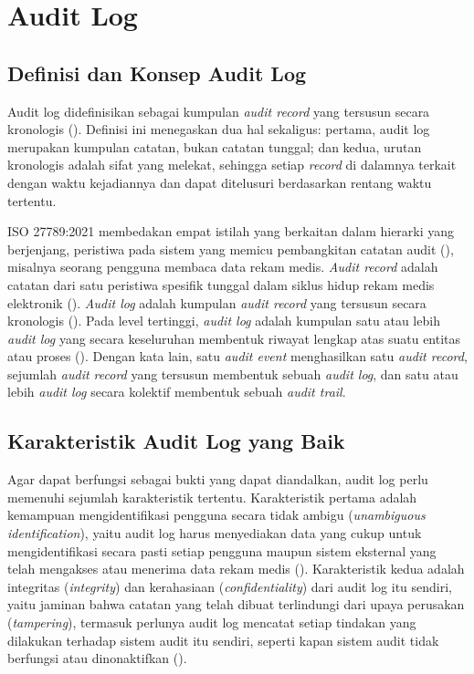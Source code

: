 \section{Audit Log}
\label{sec:audit-log}

\subsection{Definisi dan Konsep Audit Log}
\label{subsec:definisi-audit-log}

Audit log didefinisikan sebagai kumpulan \textit{audit record} yang
tersusun secara kronologis (\cite{iso27789_2021}). Definisi ini
menegaskan dua hal sekaligus: pertama, audit log merupakan kumpulan
catatan, bukan catatan tunggal; dan kedua, urutan kronologis adalah
sifat yang melekat, sehingga setiap \textit{record} di dalamnya
terkait dengan waktu kejadiannya dan dapat ditelusuri berdasarkan
rentang waktu tertentu.

ISO 27789:2021 membedakan empat istilah yang berkaitan dalam hierarki
yang berjenjang, peristiwa pada sistem yang memicu pembangkitan catatan audit (\cite{iso27789_2021}), misalnya seorang pengguna membaca data rekam
medis. \textit{Audit record} adalah catatan dari satu peristiwa
spesifik tunggal dalam siklus hidup rekam medis elektronik
(\cite{iso27789_2021}). \textit{Audit log} adalah kumpulan
\textit{audit record} yang tersusun secara kronologis
(\cite{iso27789_2021}). Pada level tertinggi, \textit{audit log}
adalah kumpulan satu atau lebih \textit{audit log} yang secara
keseluruhan membentuk riwayat lengkap atas suatu entitas atau proses
(\cite{iso27789_2021}). Dengan kata lain, satu \textit{audit event}
menghasilkan satu \textit{audit record}, sejumlah \textit{audit record}
yang tersusun membentuk sebuah \textit{audit log}, dan satu atau lebih
\textit{audit log} secara kolektif membentuk sebuah \textit{audit
trail}.

\subsection{Karakteristik Audit Log yang Baik}
\label{subsec:karakteristik-audit-log}

Agar dapat berfungsi sebagai bukti yang dapat diandalkan, audit log
perlu memenuhi sejumlah karakteristik tertentu. Karakteristik pertama
adalah kemampuan mengidentifikasi pengguna secara tidak ambigu
(\textit{unambiguous identification}), yaitu audit log harus
menyediakan data yang cukup untuk mengidentifikasi secara pasti setiap
pengguna maupun sistem eksternal yang telah mengakses atau menerima
data rekam medis (\cite{iso27789_2021}). Karakteristik kedua adalah
integritas (\textit{integrity}) dan kerahasiaan (\textit{confidentiality})
dari audit log itu sendiri, yaitu jaminan bahwa catatan yang telah
dibuat terlindungi dari upaya perusakan (\textit{tampering}), termasuk
perlunya audit log mencatat setiap tindakan yang dilakukan terhadap
sistem audit itu sendiri, seperti kapan sistem audit tidak berfungsi
atau dinonaktifkan (\cite{iso27789_2021}).

